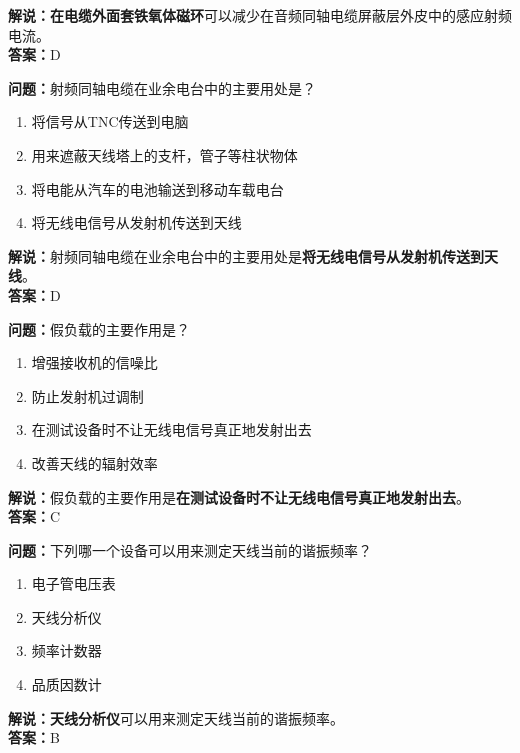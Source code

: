 \documentclass{ctexbook}
\begin{document}
\noindent\textbf{解说：}\textbf{在电缆外面套铁氧体磁环}可以减少在音频同轴电缆屏蔽层外皮中的感应射频电流。\\\noindent\textbf{答案：}D


\bigskip


\noindent\textbf{问题：}射频同轴电缆在业余电台中的主要用处是？

\begin{enumerate}[label=\Alph*), leftmargin=3em]
	\item 将信号从TNC传送到电脑
	\item 用来遮蔽天线塔上的支杆，管子等柱状物体
	\item 将电能从汽车的电池输送到移动车载电台
	\item 将无线电信号从发射机传送到天线
\end{enumerate}

\noindent\textbf{解说：}射频同轴电缆在业余电台中的主要用处是\textbf{将无线电信号从发射机传送到天线}。\\\noindent\textbf{答案：}D


\bigskip


\noindent\textbf{问题：}假负载的主要作用是？

\begin{enumerate}[label=\Alph*), leftmargin=3em]
	\item 增强接收机的信噪比
	\item 防止发射机过调制
	\item 在测试设备时不让无线电信号真正地发射出去
	\item 改善天线的辐射效率
\end{enumerate}

\noindent\textbf{解说：}假负载的主要作用是\textbf{在测试设备时不让无线电信号真正地发射出去}。\\\noindent\textbf{答案：}C


\bigskip


\noindent\textbf{问题：}下列哪一个设备可以用来测定天线当前的谐振频率？

\begin{enumerate}[label=\Alph*), leftmargin=3em]
	\item 电子管电压表
	\item 天线分析仪
	\item 频率计数器
	\item 品质因数计
\end{enumerate}

\noindent\textbf{解说：}\textbf{天线分析仪}可以用来测定天线当前的谐振频率。\\\noindent\textbf{答案：}B
\end{document}
